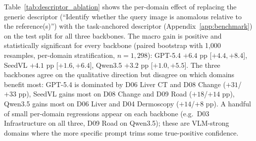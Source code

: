 Table~\ref{tab:descriptor_ablation} shows the per-domain effect of replacing the generic descriptor (``Identify whether the query image is anomalous relative to the reference(s)'') with the task-anchored descriptor (Appendix~\ref{app:benchmark}) on the test split for all three backbones. The macro gain is positive and statistically significant for every backbone (paired bootstrap with 1{,}000 resamples, per-domain stratification, $n{=}1{,}298$): GPT-5.4 $+6.4$ pp [$+4.4, +8.4$], SeedVL $+4.1$ pp [$+1.6, +6.4$], Qwen3.5 $+3.2$ pp [$+1.0, +5.5$]. The three backbones agree on the qualitative direction but disagree on which domains benefit most: GPT-5.4 is dominated by D06 Liver CT and D08 Change ($+31$/$+33$ pp), SeedVL gains most on D08 Change and D09 Road ($+18$/$+14$ pp), Qwen3.5 gains most on D06 Liver and D04 Dermoscopy ($+14$/$+8$ pp). A handful of small per-domain regressions appear on each backbone (e.g.\ D03 Infrastructure on all three, D09 Road on Qwen3.5); these are VLM-strong domains where the more specific prompt trims some true-positive confidence.

